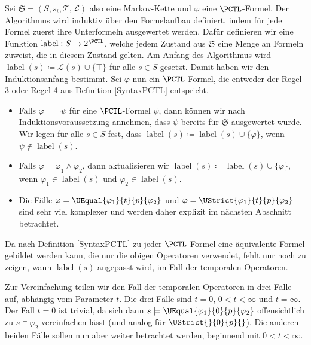 Sei $\mathfrak{S}=(S,s_i,\mathcal{T},\mathcal{L})$ also eine Markov-Kette und $\varphi$ eine $\PCTL$-Formel. 
Der Algorithmus wird induktiv über den Formelaufbau definiert, indem für jede Formel zuerst ihre Unterformeln ausgewertet werden. 
Dafür definieren wir eine Funktion $\operatorname{label}:S\to 2^\PCTL$, welche jedem Zustand aus $\mathfrak{S}$ eine Menge an Formeln zuweist, die in diesem Zustand gelten.
Am Anfang des Algorithmus wird $\operatorname{label}(s)\coloneqq\mathcal{L}(s)\cup\{\top\}$ für alle $s\in S$ gesetzt. Damit haben wir den Induktionsanfang bestimmt. Sei $\varphi$ nun ein $\PCTL$-Formel, die entweder der Regel 3 oder Regel 4 aus Definition \ref{SyntaxPCTL} entspricht.
\begin{itemize}
	\item Falls $\varphi=\neg\psi$ für eine $\PCTL$-Formel $\psi$, dann können wir nach Induktionsvoraussetzung annehmen, dass $\psi$ bereits für $\mathfrak{S}$ ausgewertet wurde. Wir legen für alle $s\in S$ fest, dass $\operatorname{label}(s)\coloneqq \operatorname{label}(s) \cup\{\varphi\}$, wenn $\psi \notin \operatorname{label}(s)$.
	\item Falls $\varphi = \varphi_1\land\varphi_2$, dann aktualisieren wir $\operatorname{label}(s)\coloneqq \operatorname{label}(s) \cup \{\varphi\}$, wenn $\varphi_1\in \operatorname{label}(s)$ und $\varphi_2\in \operatorname{label}(s)$.
	\item Die Fälle $\varphi = \UEqual{\varphi_1}{t}{p}{\varphi_2}$ und $\varphi = \UStrict{\varphi_1}{t}{p}{\varphi_2}$ sind sehr viel komplexer und werden daher explizit im nächsten Abschnitt betrachtet.
\end{itemize}
Da nach Definition \ref{SyntaxPCTL} zu jeder $\PCTL$-Formel eine äquivalente Formel gebildet werden kann, die nur die obigen Operatoren verwendet, fehlt nur noch zu zeigen, wann $\operatorname{label}(s)$ angepasst wird, im Fall der temporalen Operatoren. \cite{hansson1994logic}

Zur Vereinfachung teilen wir den Fall der temporalen Operatoren in drei Fälle auf, abhängig vom Parameter $t$. Die drei Fälle sind $t=0$, $0<t<\infty$ und $t=\infty$.
Der Fall $t=0$ ist trivial, da sich dann $s \models \UEqual{\varphi_1}{0}{p}{\varphi_2}$ offensichtlich zu $s \models \varphi_2$ vereinfachen lässt (und analog für $\UStrict{}{0}{p}{}$).
Die anderen beiden Fälle sollen nun aber weiter betrachtet werden, beginnend mit $0<t<\infty$.

